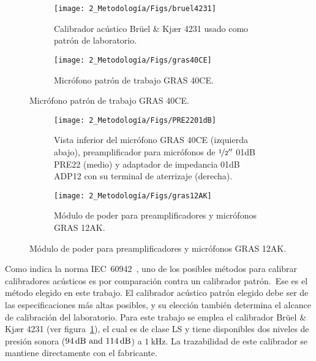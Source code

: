 \begin{figure}[!h]
    \caption{Patrones acústicos para la calibración de calibradores acústicos.}
    \centering
    \begin{subfigure}[t]{0.49\textwidth}
        \centering
        \texttt{[image: 2\_Metodología/Figs/bruel4231]}
        \caption{Calibrador acústico Brüel \& Kjær 4231 usado como patrón de laboratorio.}
        \label{fig:bruel_4231}
    \end{subfigure}
    \hfill
    \begin{subfigure}[t]{0.49\textwidth}
        \centering
        \texttt{[image: 2\_Metodología/Figs/gras40CE]}
        \caption{Micrófono patrón de trabajo GRAS 40CE.}
        \label{fig:gras_40CE}
    \end{subfigure}
\end{figure}
%
\begin{figure}[!h]
    \caption{Instrumentos para adecuación de la señal eléctrica.}
    \centering
    \begin{subfigure}[t]{0.6\textwidth}
        \centering
        \texttt{[image: 2\_Metodología/Figs/PRE2201dB]}
        \caption{Vista inferior del micrófono GRAS 40CE (izquierda abajo),
            preamplificador para micrófonos de $\nicefrac{1}{2}''$ 01dB PRE22 (medio)
            y adaptador de impedancia 01dB ADP12 con su terminal de aterrizaje (derecha).}
        \label{fig:PRE22_01dB}
    \end{subfigure}
    \hfill
    \begin{subfigure}[t]{0.38\textwidth}
        \centering
        \texttt{[image: 2\_Metodología/Figs/gras12AK]}
        \caption{Módulo de poder para preamplificadores y micrófonos GRAS 12AK.}
        \label{fig:gras_12AK}
    \end{subfigure}
\end{figure}

Como indica la norma \mbox{IEC 60942}~\citeyearpar{IEC_TC29_2017}, uno de los posibles métodos para calibrar calibradores acústicos es por comparación contra un calibrador patrón.\ Ese es el método elegido en este trabajo.
El calibrador acústico patrón elegido debe ser de las especificaciones más altas posibles, y su elección también determina el alcance de calibración del laboratorio.
Para este trabajo se emplea el calibrador Brüel \& Kjær 4231 (ver figura~\ref{fig:bruel_4231}), el cual es de clase LS y tiene disponibles dos niveles de presión sonora ($\qtylist{94;114}{\dB}$) a $\qty{1}{\kHz}$.
La trazabilidad de este calibrador se mantiene directamente con el fabricante.

